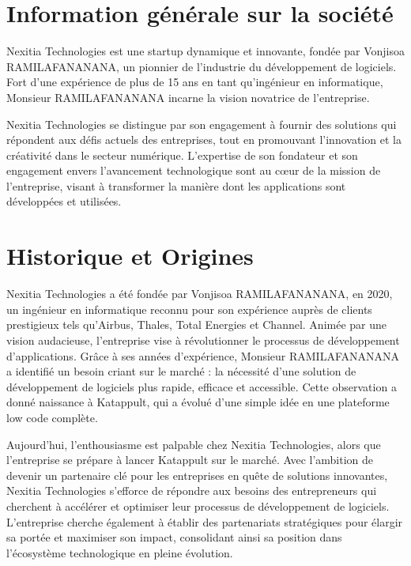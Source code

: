 \documentclass[12pt]{report}
\begin{document}
				\section{Information générale sur la société}

				\hspace{15pt} Nexitia Technologies est une startup dynamique et innovante, fondée par Vonjisoa RAMILAFANANANA, un pionnier de l'industrie du développement de logiciels. Fort d'une expérience de plus de 15 ans en tant qu'ingénieur en informatique, Monsieur RAMILAFANANANA incarne la vision novatrice de l'entreprise.

				Nexitia Technologies se distingue par son engagement à fournir des solutions qui répondent aux défis actuels des entreprises, tout en promouvant l'innovation et la créativité dans le secteur numérique. L'expertise de son fondateur et son engagement envers l'avancement technologique sont au cœur de la mission de l'entreprise, visant à transformer la manière dont les applications sont développées et utilisées.

				\section{Historique et Origines}

				\hspace{15pt} Nexitia Technologies a été fondée par Vonjisoa RAMILAFANANANA, en 2020, un ingénieur en informatique reconnu pour son expérience auprès de clients prestigieux tels qu'Airbus, Thales, Total Energies et Channel. Animée par une vision audacieuse, l'entreprise vise à révolutionner le processus de développement d'applications. Grâce à ses années d'expérience, Monsieur RAMILAFANANANA a identifié un besoin criant sur le marché : la nécessité d'une solution de développement de logiciels plus rapide, efficace et accessible. Cette observation a donné naissance à Katappult, qui a évolué d'une simple idée en une plateforme low code complète.

				Aujourd'hui, l'enthousiasme est palpable chez Nexitia Technologies, alors que l'entreprise se prépare à lancer Katappult sur le marché. Avec l'ambition de devenir un partenaire clé pour les entreprises en quête de solutions innovantes, Nexitia Technologies s'efforce de répondre aux besoins des entrepreneurs qui cherchent à accélérer et optimiser leur processus de développement de logiciels. L'entreprise cherche également à établir des partenariats stratégiques pour élargir sa portée et maximiser son impact, consolidant ainsi sa position dans l'écosystème technologique en pleine évolution.
\end{document}
